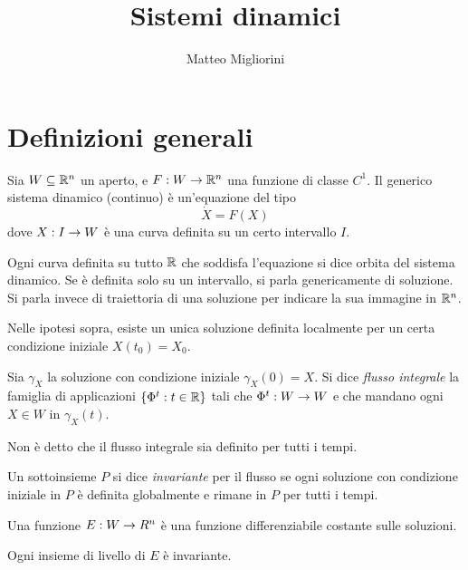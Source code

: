\documentclass[a4paper,10pt,oneside]{math_article}
\title{Sistemi dinamici}
\author{Matteo Migliorini}
\date{}
\begin{document}
	\section{Definizioni generali}
	
	Sia $W \subseteq \mathbb R^n$ un aperto, e $F: W \rightarrow \mathbb R^n$ una funzione di classe $C^1$. Il generico sistema dinamico (continuo) è un'equazione del tipo
	\[
		\dot X = F(X)
	\]
	dove $X: I \rightarrow W$ è una curva definita su un certo intervallo $I$.
	
	\begin{mydef}[Orbita]
		Ogni curva definita su tutto $\mathbb R$ che soddisfa l'equazione si dice orbita del sistema dinamico. Se è definita solo su un intervallo, si parla genericamente di soluzione. Si parla invece di traiettoria di una soluzione per indicare la sua immagine in $\mathbb R^n$.
	\end{mydef}
	
	\begin{mytheorem}
		Nelle ipotesi sopra, esiste un unica soluzione definita localmente per un certa condizione iniziale $X(t_0)=X_0$.
	\end{mytheorem}

	
	\begin{mydef}
		Sia $\gamma_{X}$ la soluzione con condizione iniziale $\gamma_X(0) = X$.
		Si dice \emph{flusso integrale} la famiglia di applicazioni $\{ \Phi^t: t \in \mathbb R\}$ tali che $\Phi^t: W\rightarrow W$ e che mandano ogni $X \in W$ in $\gamma_{X}(t)$.
	\end{mydef}
	
	\begin{myobs}
		Non è detto che il flusso integrale sia definito per tutti i tempi.
	\end{myobs}
	
	\begin{mydef}
		Un sottoinsieme $P$ si dice \emph{invariante} per il flusso se ogni soluzione con condizione iniziale in $P$ è definita globalmente e rimane in $P$ per tutti i tempi.
	\end{mydef}

	
	
	\begin{mydef}
		Una funzione $E: W \rightarrow R^n$ è una funzione differenziabile costante sulle soluzioni.
	\end{mydef}

	\begin{myobs}
		Ogni insieme di livello di $E$ è invariante.
	\end{myobs}
	
\end{document}
